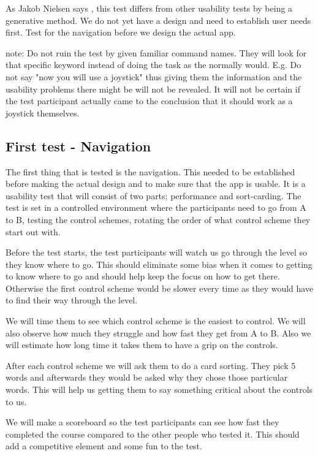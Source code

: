 As Jakob Nielsen says \cite{}, this test differs from other usability tests by being a generative method. 
We do not yet have a design and need to establish user needs first. Test for the navigation before we design the actual app. 

note: Do not ruin the test by given familiar command names. They will look for that specific keyword instead of doing the task 
as the normally would. \cite{}
E.g. Do not say "now you will use a joystick" thus giving them the information and the usability problems there might be
will not be revealed. It will not be certain if the test participant actually came to the conclusion that it should work as a joystick
themselves. 

\subsection{First test - Navigation}

The first thing that is tested is the navigation. This needed to be established before making the actual design and to make sure that the app is usable.
It is a usability test that will consist of two parts; performance and sort-carding. 
The test is set in a controlled environment where the participants need to go from A to B, testing the control schemes, rotating the order of what control scheme they start out with.

Before the test starts, the test participants will watch us go through the level so they know where to go. This should eliminate some bias when it comes to getting to know where to go and should help keep the focus on how to get there. Otherwise the first control scheme would be slower every time as they would have to find their way through the level.

We will time them to see which control scheme is the easiest to control. We will also observe how much they struggle and how fast they get from A to B. Also we will estimate how long time it takes them to have a grip on the controls.

After each control scheme we will ask them to do a card sorting. They pick 5 words and afterwards they would be asked why they chose those particular words. This will help us getting them to say something critical about the controls to us. 

We will make a scoreboard so the test participants can see how fast they completed the course compared to the other people who tested it.
This should add a competitive element and some fun to the test.

